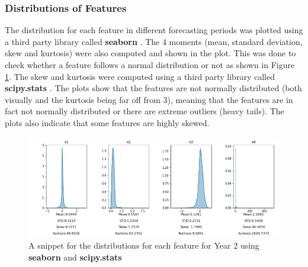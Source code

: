 \subsubsection{Distributions of Features}\label{sssec:featdist}

\noindent The distribution for each feature in different forecasting periods was plotted using a third party library called \textbf{seaborn} \cite{python:seaborn}. The 4 moments (mean, standard deviation, skew and kurtosis) were also computed and shown in the plot. This was done to check whether a feature follows a normal distribution or not as shown in Figure \ref{fig:feature_dist}. The skew and kurtosis were computed using a third party library called \textbf{scipy.stats} \cite{python:scipy}. The plots show that the features are not normally distributed (both visually and the kurtosis being far off from 3), meaning that the features are in fact not normally distributed or there are extreme outliers (heavy tails). The plots also indicate that some features are highly skewed. 
\begin{figure}[H]
\centering
  \includegraphics[scale = .7]{imgs/feature_distributions.JPG}
  \caption{A snippet for the distributions for each feature for Year 2 using \textbf{seaborn} and \textbf{scipy.stats}}
  \label{fig:feature_dist}
\end{figure}

